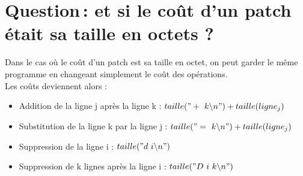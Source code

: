 \documentclass[a4paper, 10pt, french]{article}
\begin{document}
\section{Question\,: et  si le coût d'un patch était sa taille en octets ?}
    Dans le cas où le coût d'un patch est sa taille en octet,
on peut garder le même programme en changeant simplement le coût des opérations.\\

\noindent Les coûts deviennent alors :

\begin{itemize}
\item Addition de la ligne j après la ligne k : $taille("+\ k\backslash n") + taille(ligne_j)$
\item Substitution de la ligne k par la ligne j : $taille("=\ k\backslash n") + taille(ligne_j)$
\item Suppression de la ligne i : $taille("d\ i\backslash n")$
\item Suppression de k lignes après la ligne i : $taille("D\ i\ k\backslash n")$
\end{itemize}

\end{document}
